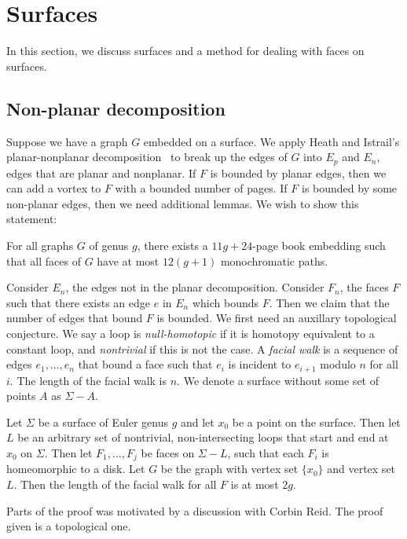 
\section{Surfaces}
In this section, we discuss surfaces and a method for dealing with faces on surfaces.
\subsection{Non-planar decomposition}
Suppose we have a graph \(G\) embedded on a surface. We apply Heath and Istrail's planar-nonplanar decomposition~\cite{heathPagenumberGenusGraphs1992} to break up the edges of \(G\) into \(E_p\) and \(E_n\), edges that are planar and nonplanar. If \(F\) is bounded by planar edges, then we can add a vortex to \(F\) with a bounded number of pages. If \(F\) is bounded by some non-planar edges, then we need additional lemmas.
We wish to show this statement:
\begin{theorem}
	For all graphs \(G\) of genus \(g\), there exists a \(11g + 24\)-page book embedding such that all faces of $G$ have at most \( 12(g + 1)\) monochromatic paths.
\end{theorem}
Consider \(E_n\), the edges not in the planar decomposition. Consider \(F_n\), the faces \(F\) such that there exists an edge \(e\) in \(E_n\) which bounds \(F\). Then we claim that the number of edges that bound \(F\) is bounded. We first need an auxillary topological conjecture. We say a loop is \textit{null-homotopic} if it is homotopy equivalent to a constant loop, and \textit{nontrivial} if this is not the case. A \textit{facial walk} is a sequence of edges \(e_1, \ldots, e_n\) that bound a face such that \(e_i\) is incident to \(e_{i + 1}\) modulo \(n\) for all \(i\). The length of the facial walk is \(n\). We denote a surface without some set of points $A$ as $\Sigma - A$. 

\begin{lemma}\label{lem:orientable_facial_walks}
	Let \(\Sigma \) be a surface of Euler genus \(g\) and let \(x_0\) be a point on the surface. Then let \(L\) be an arbitrary set of nontrivial, non-intersecting loops that start and end at \(x_0\) on \(\Sigma \). Then let \(F_1, \ldots, F_j\) be faces on \(\Sigma - L\), such that each \(F_i\) is homeomorphic to a disk. Let $G$ be the graph with vertex set $\{x_0 \}$ and vertex set $L$. Then the length of the facial walk for all \(F\) is at most \(2g\).
\end{lemma}

Parts of the proof was motivated by a discussion with Corbin Reid. The proof given is a topological one.

